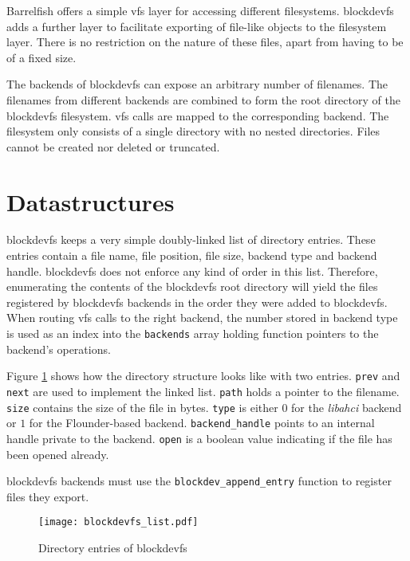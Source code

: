 Barrelfish offers a simple \acs{vfs} layer for accessing different filesystems.
blockdevfs adds a further layer to facilitate exporting of file-like objects to
the filesystem layer.  There is no restriction on the nature of these files,
apart from having to be of a fixed size.

The backends of blockdevfs can expose an arbitrary number of filenames. The
filenames from different backends are combined to form the root directory of
the blockdevfs filesystem. \acs{vfs} calls are mapped to the corresponding backend.
The filesystem only consists of a single directory with no nested directories.
Files cannot be created nor deleted or truncated.

\section{Datastructures}

blockdevfs keeps a very simple doubly-linked list of directory entries.  These
entries contain a file name, file position, file size, backend type and backend
handle. blockdevfs does not enforce any kind of order in this list. Therefore,
enumerating the contents of the blockdevfs root directory will yield the files
registered by blockdevfs backends in the order they were added to blockdevfs.
When routing \acs{vfs} calls to the right backend, the number stored in backend type
is used as an index into the \lstinline+backends+ array holding function
pointers to the backend's operations.

Figure \ref{fig:blockdevfs_list} shows how the directory structure looks like
with two entries. \lstinline+prev+ and \lstinline+next+ are used to implement
the linked list. \lstinline+path+ holds a pointer to the filename.
\lstinline+size+ contains the size of the file in bytes. \lstinline+type+ is
either $0$ for the \emph{libahci} backend or $1$ for the Flounder-based
backend. \lstinline+backend_handle+ points to an internal handle private to the
backend. \lstinline+open+ is a boolean value indicating if the file has been
opened already.

blockdevfs backends must use the \lstinline+blockdev_append_entry+ function to
register files they export.

\begin{figure}[ht]
\centering
\texttt{[image: blockdevfs\_list.pdf]}
\caption{Directory entries of blockdevfs}
\label{fig:blockdevfs_list}
\end{figure}

